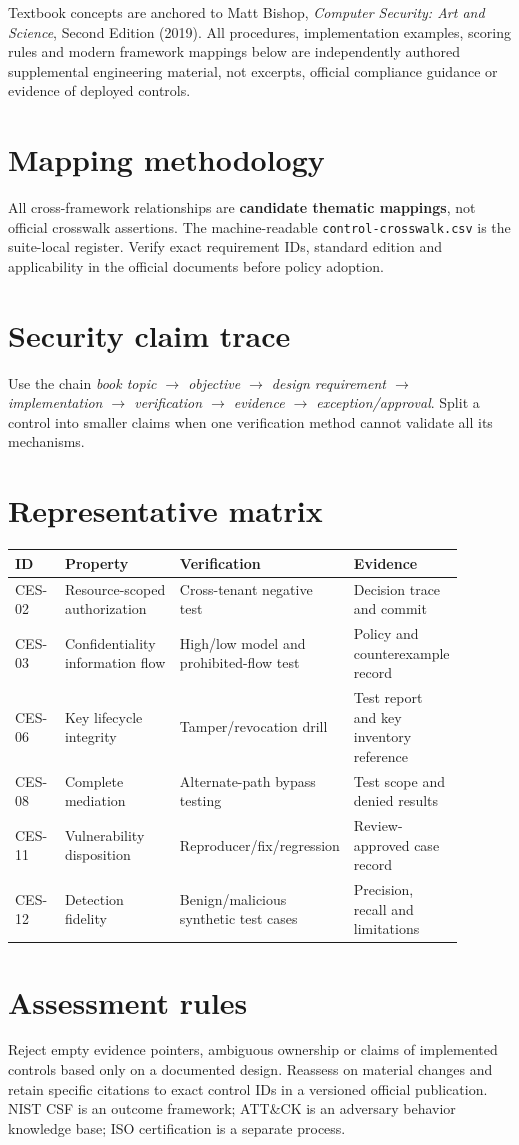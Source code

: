 \documentclass[10pt,letterpaper]{article}
\begin{document}
\makedoctocpage
\begin{notebox}
Textbook concepts are anchored to Matt Bishop, \emph{Computer Security: Art and Science}, Second Edition (2019). All procedures, implementation examples, scoring rules and modern framework mappings below are independently authored supplemental engineering material, not excerpts, official compliance guidance or evidence of deployed controls.
\end{notebox}
\section{Mapping methodology}
All cross-framework relationships are \textbf{candidate thematic mappings}, not official crosswalk assertions. The machine-readable \texttt{control-crosswalk.csv} is the suite-local register. Verify exact requirement IDs, standard edition and applicability in the official documents before policy adoption.
\section{Security claim trace}
Use the chain \emph{book topic $\rightarrow$ objective $\rightarrow$ design requirement $\rightarrow$ implementation $\rightarrow$ verification $\rightarrow$ evidence $\rightarrow$ exception/approval}. Split a control into smaller claims when one verification method cannot validate all its mechanisms.
\section{Representative matrix}
\begin{longtable}{@{}p{0.12\linewidth}p{0.28\linewidth}p{0.28\linewidth}p{0.21\linewidth}@{}}\toprule ID & Property & Verification & Evidence\\\midrule\endhead
CES-02 & Resource-scoped authorization & Cross-tenant negative test & Decision trace and commit\\
CES-03 & Confidentiality information flow & High/low model and prohibited-flow test & Policy and counterexample record\\
CES-06 & Key lifecycle integrity & Tamper/revocation drill & Test report and key inventory reference\\
CES-08 & Complete mediation & Alternate-path bypass testing & Test scope and denied results\\
CES-11 & Vulnerability disposition & Reproducer/fix/regression & Review-approved case record\\
CES-12 & Detection fidelity & Benign/malicious synthetic test cases & Precision, recall and limitations\\\bottomrule\end{longtable}
\section{Assessment rules}
Reject empty evidence pointers, ambiguous ownership or claims of implemented controls based only on a documented design. Reassess on material changes and retain specific citations to exact control IDs in a versioned official publication. NIST CSF is an outcome framework; ATT\&CK is an adversary behavior knowledge base; ISO certification is a separate process.
\end{document}
